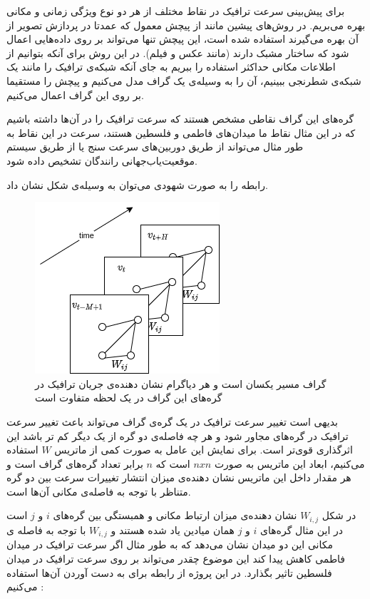 \documentclass{article}
\begin{document}
برای پیش‌بینی سرعت ترافیک در نقاط مختلف از هر دو نوع ویژگی زمانی و مکانی بهره می‌بریم.
در روش‌های پیشین مانند  از پیچش معمول که عمدتا در پردازش تصویر از آن بهره می‌گیرند استفاده شده است، این پیچش تنها می‌تواند بر روی داده‌هایی اعمال شود که ساختار مشبک دارند (مانند عکس و فیلم).
در این روش برای آنکه بتوانیم از اطلاعات مکانی حداکثر استفاده را ببریم به جای آنکه شبکه‌ی ترافیک را مانند یک شبکه‌‌ی شطرنجی ببینیم،
آن را به وسیله‌ی یک گراف مدل می‌کنیم و پیچش را مستقیما بر روی این گراف اعمال می‌کنیم.

گره‌های این گراف نقاطی مشخص هستند که سرعت ترافیک را در آن‌ها داشته باشیم که در این مثال نقاط ما میدان‌های فاطمی و فلسطین هستند،
سرعت در این نقاط به طور مثال می‌تواند از طریق دوربین‌های سرعت سنج یا از طریق سیستم موقعیت‌‌یاب‌جهانی رانندگان تشخیص داده شود.

رابطه  را به صورت شهودی می‌توان به وسیله‌ی شکل  نشان داد.

\begin{figure}
  \includegraphics{./images/base.png}
  \centering
  \caption{
گراف مسیر یکسان است و هر دیاگرام نشان دهنده‌ی جریان ترافیک در گره‌های این گراف در یک لحظه متفاوت است
  }
  \label{fig:base}
\end{figure}

بدیهی است تغییر سرعت ترافیک در یک گره‌ی گراف می‌تواند باعث تغییر سرعت ترافیک در گره‌های مجاور شود و هر چه فاصله‌ی دو گره از یک دیگر کم تر باشد این اثرگذاری قوی‌تر است.
برای نمایش این عامل به صورت کمی از ماتریس $W$ استفاده می‌کنیم، ابعاد این ماتریس به صورت $n x n$ است که $n$ برابر تعداد گره‌های گراف است و هر مقدار داخل این ماتریس نشان دهنده‌ی میزان انتشار تغییرات سرعت بین دو گره متناظر با توجه به فاصله‌ی مکانی آن‌ها است.

در شکل  $W_{i,j}$ نشان دهنده‌ی میزان ارتباط مکانی و همبستگی بین گره‌های $i$ و $j$ است در این مثال گره‌های $i$ و $j$ همان میادین یاد شده هستند و $W_{i,j}$ با توجه به فاصله ی مکانی این دو میدان نشان می‌دهد که
به طور مثال اگر سرعت ترافیک در میدان فاطمی کاهش پیدا کند این موضوع چقدر می‌تواند بر روی سرعت ترافیک در میدان فلسطین تاثیر بگذارد.
در این پروژه از رابطه‌  برای به دست آوردن آن‌ها استفاده می‌کنیم :
\end{document}
